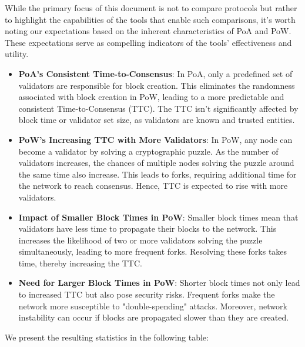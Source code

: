 While the primary focus of this document is not to compare protocols but rather to highlight the capabilities of the tools that enable such comparisons, it's worth noting our expectations based on the inherent characteristics of PoA and PoW. These expectations serve as compelling indicators of the tools' effectiveness and utility.

\begin{itemize}
    \item \textbf{PoA's Consistent Time-to-Consensus}: In PoA, only a predefined set of validators are responsible for block creation. This eliminates the randomness associated with block creation in PoW, leading to a more predictable and consistent Time-to-Consensus (TTC). The TTC isn't significantly affected by block time or validator set size, as validators are known and trusted entities.

    \item \textbf{PoW's Increasing TTC with More Validators}: In PoW, any node can become a validator by solving a cryptographic puzzle. As the number of validators increases, the chances of multiple nodes solving the puzzle around the same time also increase. This leads to forks, requiring additional time for the network to reach consensus. Hence, TTC is expected to rise with more validators.

    \item \textbf{Impact of Smaller Block Times in PoW}: Smaller block times mean that validators have less time to propagate their blocks to the network. This increases the likelihood of two or more validators solving the puzzle simultaneously, leading to more frequent forks. Resolving these forks takes time, thereby increasing the TTC.

    \item \textbf{Need for Larger Block Times in PoW}: Shorter block times not only lead to increased TTC but also pose security risks. Frequent forks make the network more susceptible to "double-spending" attacks. Moreover, network instability can occur if blocks are propagated slower than they are created.
\end{itemize}


We present the resulting statistics in the following table:


